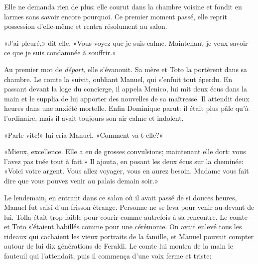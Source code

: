 Elle ne demanda rien de plus; elle courut dans la chambre voisine et
fondit en larmes sans savoir encore pourquoi. Ce premier moment passé,
elle reprit possession d'elle-même et rentra résolument au salon.

«J'ai pleuré,» dit-elle. «Vous voyez que je suis calme. Maintenant je
veux savoir ce que je suis condamnée à souffrir.»

Au premier mot de \emph{départ,} elle s'évanouit. Sa mère et Toto la
portèrent dans sa chambre. Le comte la suivit, oubliant Manuel, qui
s'enfuit tout éperdu. En passant devant la loge du concierge, il appela
Menico, lui mit deux écus dans la main et le supplia de lui apporter des
nouvelles de sa maîtresse. Il attendit deux heures dans une anxiété
mortelle. Enfin Dominique parut: il était plus pâle qu'à l'ordinaire,
mais il avait toujours son air calme et indolent.

«Parle vite!» lui cria Manuel. «Comment va-t-elle?»

«Mieux, excellence. Elle a eu de grosses convulsions; maintenant elle
dort: vous l'avez pas tuée tout à fait.» Il ajouta, en posant les deux
écus sur la cheminée: «Voici votre argent. Vous allez voyager, vous en
aurez besoin. Madame vous fait dire que vous pouvez venir au palais
demain soir.»

Le lendemain, en entrant dans ce salon où il avait passé de si douces
heures, Manuel fut saisi d'un frisson étrange. Personne ne se leva pour
venir au-devant de lui. Tolla était trop faible pour courir comme
autrefois à sa rencontre. Le comte et Toto s'étaient habillés comme pour
une cérémonie. On avait enlevé tous les rideaux qui cachaient les vieux
portraits de la famille, et Manuel pouvait compter autour de lui dix
générations de Feraldi. Le comte lui montra de la main le fauteuil qui
l'attendait, puis il commença d'une voix ferme et triste:

